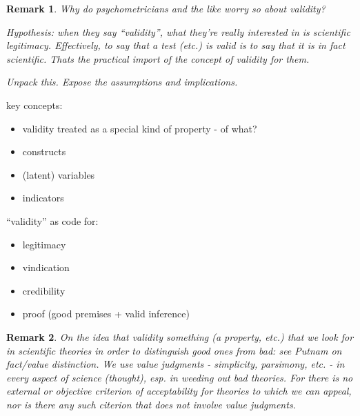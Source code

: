 \documentclass[11pt,twoside]{article}
\newtheorem{remark}{Remark}
\begin{document}
\begin{remark}
Why do psychometricians and the like worry so about validity?

Hypothesis: when they say ``validity'', what they're really interested
in is scientific legitimacy.  Effectively, to say that a test (etc.)
is valid is to say that it is in fact scientific.  Thats the practical
import of the concept of validity for them.

Unpack this.  Expose the assumptions and implications.
\end{remark}

key concepts:

\begin{itemize}
\item validity treated as a special kind of property - of what?
\item constructs
\item (latent) variables
\item indicators
\end{itemize}

``validity'' as code for:

\begin{itemize}
\item legitimacy
\item vindication
\item credibility
\item proof (good premises + valid inference)
\end{itemize}

\begin{remark}
  On the idea that validity something (a property, etc.) that we look
  for in scientific theories in order to distinguish good ones from
  bad: see Putnam on fact/value distinction.  We use value judgments -
  simplicity, parsimony, etc. - in every aspect of science (thought),
  esp. in weeding out bad theories.  For there is no external or
  objective criterion of acceptability for theories to which we can
  appeal, nor is there any such citerion that does not involve value
  judgments.
\end{remark}
\end{document}
